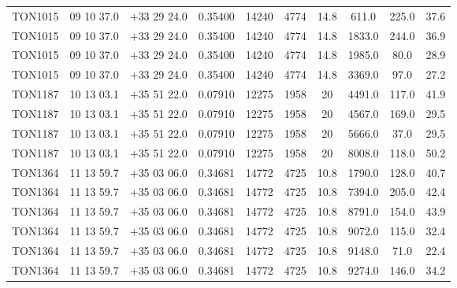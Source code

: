 \begin{landscape}
\begin{center}
\begin{longtable}{l c c c c c c c c c}
TON1015  &                 09 10 37.0  &         $+$33 29 24.0  &       0.35400  & 14240  &   4774  &       14.8  &      611.0  &   225.0  &  37.6  \\
TON1015  &                 09 10 37.0  &         $+$33 29 24.0  &       0.35400  & 14240  &   4774  &       14.8  &      1833.0  &  244.0  &  36.9  \\
TON1015  &                 09 10 37.0  &         $+$33 29 24.0  &       0.35400  & 14240  &   4774  &       14.8  &      1985.0  &  80.0  &   28.9  \\
TON1015  &                 09 10 37.0  &         $+$33 29 24.0  &       0.35400  & 14240  &   4774  &       14.8  &      3369.0  &  97.0  &   27.2  \\
TON1187  &                 10 13 03.1  &         $+$35 51 22.0  &       0.07910  & 12275  &   1958  &       20  &        4491.0  &  117.0  &  41.9  \\
TON1187  &                 10 13 03.1  &         $+$35 51 22.0  &       0.07910  & 12275  &   1958  &       20  &        4567.0  &  169.0  &  29.5  \\
TON1187  &                 10 13 03.1  &         $+$35 51 22.0  &       0.07910  & 12275  &   1958  &       20  &        5666.0  &  37.0  &   29.5  \\
TON1187  &                 10 13 03.1  &         $+$35 51 22.0  &       0.07910  & 12275  &   1958  &       20  &        8008.0  &  118.0  &  50.2  \\
TON1364  &                 11 13 59.7  &         $+$35 03 06.0  &       0.34681  & 14772  &   4725  &       10.8  &      1790.0  &  128.0  &  40.7  \\
TON1364  &                 11 13 59.7  &         $+$35 03 06.0  &       0.34681  & 14772  &   4725  &       10.8  &      7394.0  &  205.0  &  42.4  \\
TON1364  &                 11 13 59.7  &         $+$35 03 06.0  &       0.34681  & 14772  &   4725  &       10.8  &      8791.0  &  154.0  &  43.9  \\
TON1364  &                 11 13 59.7  &         $+$35 03 06.0  &       0.34681  & 14772  &   4725  &       10.8  &      9072.0  &  115.0  &  32.4  \\
TON1364  &                 11 13 59.7  &         $+$35 03 06.0  &       0.34681  & 14772  &   4725  &       10.8  &      9148.0  &  71.0  &   22.4  \\
TON1364  &                 11 13 59.7  &         $+$35 03 06.0  &       0.34681  & 14772  &   4725  &       10.8  &      9274.0  &  146.0  &  34.2  \\

\end{longtable}
\end{center}
\end{landscape}
